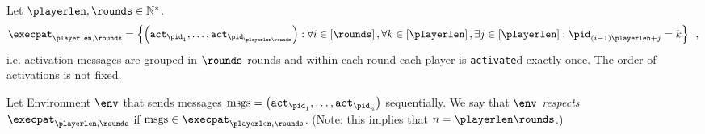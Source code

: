\begin{definition}
  \label{model:def:execpat}
  Let $\playerlen, \rounds \in \mathbb{N}^*$.
  \begin{equation*}
    \execpat_{\playerlen, \rounds} = \left\{\left(\mathtt{act}_{\pid_1}, \dots,
    \mathtt{act}_{\pid_{\playerlen \rounds}}\right) : \forall i \in
    \left[\rounds\right], \forall k \in
    \left[\playerlen\right], \exists j \in \left[\playerlen\right]: \pid_{(i -
    1) \playerlen + j} = k\right\} \enspace,
  \end{equation*}
  i.e. activation messages are grouped in $\rounds$ rounds and within each round
  each player is \texttt{activate}d exactly once. The order of activations is
  not fixed.

  Let Environment $\env$ that sends messages $\mathrm{msgs} =
  \left(\mathtt{act}_{\pid_1}, \dots, \mathtt{act}_{\pid_n}\right)$
  sequentially. We say that \emph{$\env$ respects $\execpat_{\playerlen,
  \rounds}$} if $\mathrm{msgs} \in \execpat_{\playerlen, \rounds}$. (Note: this
  implies that $n = \playerlen \rounds$.)
\end{definition}
